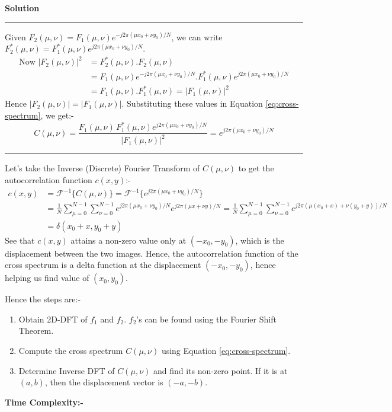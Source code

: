 \documentclass[a4paper,12pt]{article}
\newenvironment{solution}[2][]{%
\begin{mdframed}[linecolor=blue!70!black, linewidth=2pt, roundcorner=10pt, backgroundcolor=yellow!10!white, skipabove=12pt, skipbelow=12pt]%
	\textbf{\large #2}
	\par\noindent\rule{\textwidth}{0.4pt}
}{
\end{mdframed}
}
\begin{document}
\begin{solution}{Solution}
Given $F_2(\mu, \nu) = F_1(\mu, \nu) e^{-j2\pi (\mu x_0 + \nu y_0)/N}$, we can write $F_2^{*}(\mu, \nu) = F_1^{*}(\mu, \nu) e^{j2\pi (\mu x_0 + \nu y_0)/N}$.
\begin{align*}
	\text{Now }|F_2(\mu, \nu)|^2 &= F_2^{*}(\mu, \nu) . F_2(\mu, \nu) \\
	&= F_1(\mu, \nu) e^{-j2\pi (\mu x_0 + \nu y_0)/N} . F_1^{*}(\mu, \nu) e^{j2\pi (\mu x_0 + \nu y_0)/N} \\
	&= F_1(\mu, \nu) . F_1^{*}(\mu, \nu) = |F_1(\mu, \nu)|^2
\end{align*}
Hence $|F_2(\mu, \nu)| = |F_1(\mu, \nu)|$. Substituting these values in Equation \ref{eq:cross-spectrum}, we get:-
\[C(\mu, \nu) = \frac{F_1(\mu, \nu) \, F_1^{*}(\mu, \nu) e^{j2\pi (\mu x_0 + \nu y_0)/N}}{|F_1(\mu, \nu)|^2} = e^{j2\pi (\mu x_0 + \nu y_0)/N}\]
\hrule
\vspace{5pt}
Let's take the Inverse (Discrete) Fourier Transform of $C(\mu, \nu)$ to get the autocorrelation function $c(x, y)$:-
\begin{align*}
	c(x, y) &= \mathcal{F}^{-1}\{C(\mu, \nu)\} = \mathcal{F}^{-1}\{e^{j2\pi (\mu x_0 + \nu y_0)/N}\} \\
	&= \frac{1}{N} \sum_{\mu=0}^{N-1} \sum_{\nu=0}^{N-1} e^{j2\pi (\mu x_0 + \nu y_0)/N} e^{j2\pi (\mu x + \nu y)/N} = \frac{1}{N} \sum_{\mu=0}^{N-1} \sum_{\nu=0}^{N-1} e^{j2\pi (\mu (x_0 + x) + \nu (y_0 + y))/N} \\
	&= \delta(x_0 + x, y_0 + y)
\end{align*}
See that $c(x,y)$ attains a non-zero value only at $(-x_0, -y_0)$, which is the displacement between the two images. Hence, the autocorrelation function of the cross spectrum is a delta function at the displacement $(-x_0, -y_0)$, hence helping us find value of $(x_0, y_0)$.

Hence the steps are:-
\begin{enumerate}
	\item Obtain 2D-DFT of $f_1$ and $f_2$. $f_2$'s can be found using the Fourier Shift Theorem.
	\item Compute the cross spectrum $C(\mu, \nu)$ using Equation \ref{eq:cross-spectrum}.
	\item Determine Inverse DFT of $C(\mu, \nu)$ and find its non-zero point. If it is at $(a, b)$, then the displacement vector is $(-a, -b)$.
\end{enumerate}

\textbf{\Large Time Complexity:-}


\end{solution}
\end{document}
